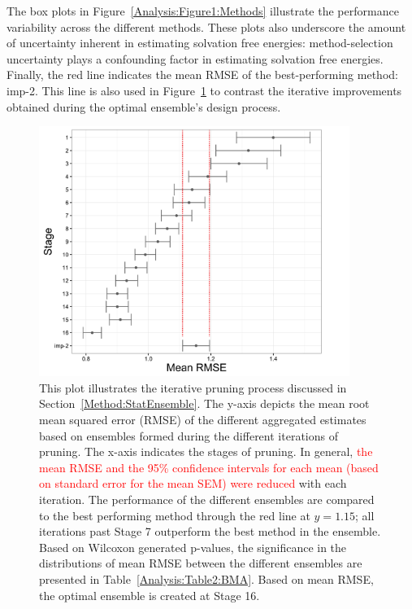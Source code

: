 \documentclass[journal=jpcbfk, manuscript=article]{achemso}
\newcommand{\+}[1]{\ensuremath{\mathbf{#1}}}
\newcommand{\rev}[1]{\textsf{\textcolor{red}{#1}}}
\begin{document}
The box plots in Figure~\ref{Analysis:Figure1:Methods} illustrate the performance variability across the different methods.
These plots also underscore the amount of uncertainty inherent in estimating solvation free energies: method-selection uncertainty plays a confounding factor in estimating solvation free energies.
Finally, the red line indicates the mean RMSE of the best-performing method: imp-2.
This line is also used in Figure~\ref{Analysis:Figure2:BMA} to contrast the iterative improvements obtained during the optimal ensemble's design process.
\begin{figure}[h!]
	\centering
	\includegraphics[keepaspectratio,width=0.9\textwidth]{Figures/Rev2/Exploratory_RMSE}
	\caption{This plot illustrates the iterative pruning process discussed in Section~\ref{Method:StatEnsemble}. The y-axis depicts the mean root mean squared error (RMSE) of the different aggregated estimates based on ensembles formed during the different iterations of pruning. The x-axis indicates the stages of pruning. In general, \rev{the mean RMSE and the 95\% confidence intervals for each mean (based on standard error for the mean SEM) were reduced} with each iteration. The performance of the different ensembles are compared to the best performing method through the red line at $y=1.15$; all iterations past Stage 7 outperform the best method in the ensemble. Based on Wilcoxon generated p-values, the significance in the distributions of mean RMSE between the different ensembles are presented in Table~\ref{Analysis:Table2:BMA}. Based on mean RMSE, the optimal ensemble is created at Stage 16.}
	\label{Analysis:Figure2:BMA}
\end{figure}
\end{document}
